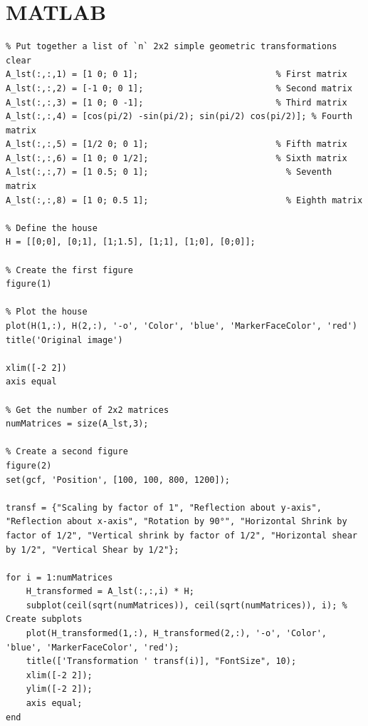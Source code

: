 \documentclass{article}
\begin{document}
\section{MATLAB}

\sloppy
\setlength{\parindent}{0pt}

\begin{verbatim}
% Put together a list of `n` 2x2 simple geometric transformations
clear
A_lst(:,:,1) = [1 0; 0 1];                           % First matrix
A_lst(:,:,2) = [-1 0; 0 1];                          % Second matrix
A_lst(:,:,3) = [1 0; 0 -1];                          % Third matrix
A_lst(:,:,4) = [cos(pi/2) -sin(pi/2); sin(pi/2) cos(pi/2)]; % Fourth matrix
A_lst(:,:,5) = [1/2 0; 0 1];                         % Fifth matrix
A_lst(:,:,6) = [1 0; 0 1/2];                         % Sixth matrix
A_lst(:,:,7) = [1 0.5; 0 1];                           % Seventh matrix
A_lst(:,:,8) = [1 0; 0.5 1];                           % Eighth matrix

% Define the house
H = [[0;0], [0;1], [1;1.5], [1;1], [1;0], [0;0]];

% Create the first figure
figure(1)

% Plot the house
plot(H(1,:), H(2,:), '-o', 'Color', 'blue', 'MarkerFaceColor', 'red')
title('Original image')

xlim([-2 2])
axis equal

% Get the number of 2x2 matrices
numMatrices = size(A_lst,3);

% Create a second figure
figure(2)
set(gcf, 'Position', [100, 100, 800, 1200]);

transf = {"Scaling by factor of 1", "Reflection about y-axis", "Reflection about x-axis", "Rotation by 90°", "Horizontal Shrink by factor of 1/2", "Vertical shrink by factor of 1/2", "Horizontal shear by 1/2", "Vertical Shear by 1/2"};

for i = 1:numMatrices
    H_transformed = A_lst(:,:,i) * H;
    subplot(ceil(sqrt(numMatrices)), ceil(sqrt(numMatrices)), i); % Create subplots
    plot(H_transformed(1,:), H_transformed(2,:), '-o', 'Color', 'blue', 'MarkerFaceColor', 'red');
    title(['Transformation ' transf(i)], "FontSize", 10);
    xlim([-2 2]);
    ylim([-2 2]);
    axis equal;
end
\end{verbatim}
\end{document}
